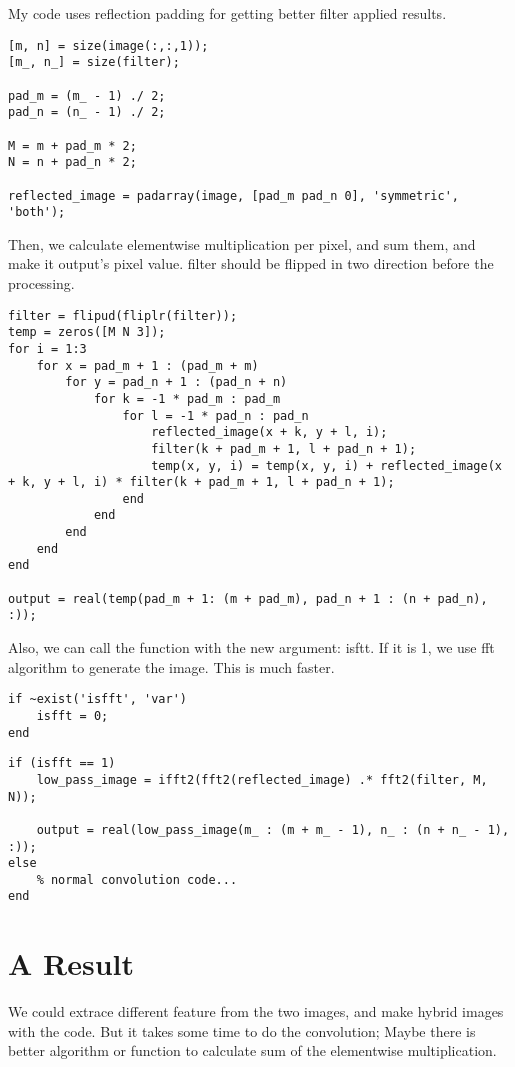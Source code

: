 My code uses reflection padding for getting better filter applied results.

\begin{lstlisting}[style=Matlab-editor]
[m, n] = size(image(:,:,1));
[m_, n_] = size(filter);

pad_m = (m_ - 1) ./ 2;
pad_n = (n_ - 1) ./ 2;

M = m + pad_m * 2;
N = n + pad_n * 2;

reflected_image = padarray(image, [pad_m pad_n 0], 'symmetric', 'both');
\end{lstlisting}

Then, we calculate elementwise multiplication per pixel, and sum them, and make it output's pixel value.
filter should be flipped in two direction before the processing.

\begin{lstlisting}[style=Matlab-editor]
filter = flipud(fliplr(filter));
temp = zeros([M N 3]);
for i = 1:3
    for x = pad_m + 1 : (pad_m + m)
        for y = pad_n + 1 : (pad_n + n)
            for k = -1 * pad_m : pad_m
                for l = -1 * pad_n : pad_n
                    reflected_image(x + k, y + l, i);
                    filter(k + pad_m + 1, l + pad_n + 1);
                    temp(x, y, i) = temp(x, y, i) + reflected_image(x + k, y + l, i) * filter(k + pad_m + 1, l + pad_n + 1);
                end
            end
        end
    end
end

output = real(temp(pad_m + 1: (m + pad_m), pad_n + 1 : (n + pad_n), :));
\end{lstlisting}

Also, we can call the function with the new argument: isftt. If it is 1, we use fft algorithm to generate the image. This is much faster.

\begin{lstlisting}[style=Matlab-editor]
if ~exist('isfft', 'var')
    isfft = 0;
end
\end{lstlisting}

\begin{lstlisting}[style=Matlab-editor]
if (isfft == 1)
    low_pass_image = ifft2(fft2(reflected_image) .* fft2(filter, M, N));

    output = real(low_pass_image(m_ : (m + m_ - 1), n_ : (n + n_ - 1), :));
else
    % normal convolution code...
end
\end{lstlisting}

\section*{A Result}

We could extrace different feature from the two images, and make hybrid images with the code.
But it takes some time to do the convolution; Maybe there is better algorithm or function to calculate sum of the elementwise multiplication.

